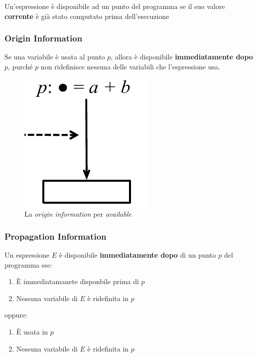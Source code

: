 \begin{definition}
Un'espressione \`e disponibile ad un punto del programma se il suo valore
\textbf{corrente} \`e gi\`a stato computato prima dell'esecuzione
\end{definition}

\subsubsection{Origin Information}
Se una variabile \`e usata al punto $p$, allora \`e disponibile
\textbf{immediatamente dopo} $p$, purch\'e $p$ non ridefinisce nessuna delle
variabili che l'espressione usa.

\begin{figure}[H]
  \centering
  \includegraphics[scale=0.4]{res/image/origin_available}
  \caption{La \textit{origin information} per \textit{available}}
  \label{img:origin_available}
\end{figure}

\subsubsection{Propagation Information}
Un espressione $E$ \`e disponibile \textbf{immediatamente dopo} di un punto $p$
del programma sse:
\begin{enumerate}
\item \`E immediatamanete disponbile prima di $p$
\item Nessuna variabile di $E$ \`e ridefinita in $p$
\end{enumerate}

oppure:
\begin{enumerate}
\item \`E usata in $p$
\item Nessuna variabile di $E$ \`e ridefinita in $p$
\end{enumerate}

